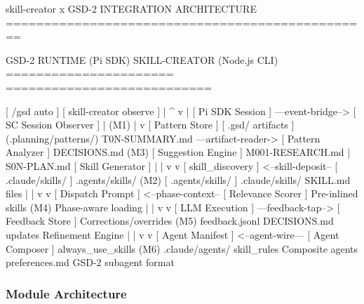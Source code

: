 \documentclass[11pt,letterpaper]{article}
\begin{document}
\begin{asciibox}
skill-creator x GSD-2 INTEGRATION ARCHITECTURE
================================================

  GSD-2 RUNTIME (Pi SDK)                SKILL-CREATOR (Node.js CLI)
  ======================                ===========================

  [ /gsd auto ]                         [ skill-creator observe ]
       |                                        ^
       v                                        |
  [ Pi SDK Session ]  ---event-bridge-->  [ SC Session Observer ]
       |                   (M1)                 |
       v                                  [ Pattern Store ]
  [ .gsd/ artifacts ]                     (.planning/patterns/)
  T0N-SUMMARY.md     ---artifact-reader-> [ Pattern Analyzer ]
  DECISIONS.md            (M3)            [ Suggestion Engine ]
  M001-RESEARCH.md                              |
  S0N-PLAN.md                            [ Skill Generator ]
       |                                        |
       v                                        v
  [ skill_discovery ]  <--skill-deposit-- [ .claude/skills/  ]
  .agents/skills/          (M2)           [ .agents/skills/  ]
  .claude/skills/                         SKILL.md files
       |                                        |
       v                                        v
  [ Dispatch Prompt ]  <--phase-context-- [ Relevance Scorer ]
  Pre-inlined skills        (M4)          Phase-aware loading
       |                                        |
       v                                        v
  [ LLM Execution ]   ---feedback-tap-->  [ Feedback Store ]
  Corrections/overrides      (M5)         feedback.jsonl
  DECISIONS.md updates                    Refinement Engine
       |                                        |
       v                                        v
  [ Agent Manifest ]  <--agent-wire---   [ Agent Composer ]
  always_use_skills         (M6)         .claude/agents/
  skill_rules                            Composite agents
  preferences.md                         GSD-2 subagent format
\end{asciibox}

\subsubsection{Module Architecture}
\end{document}
